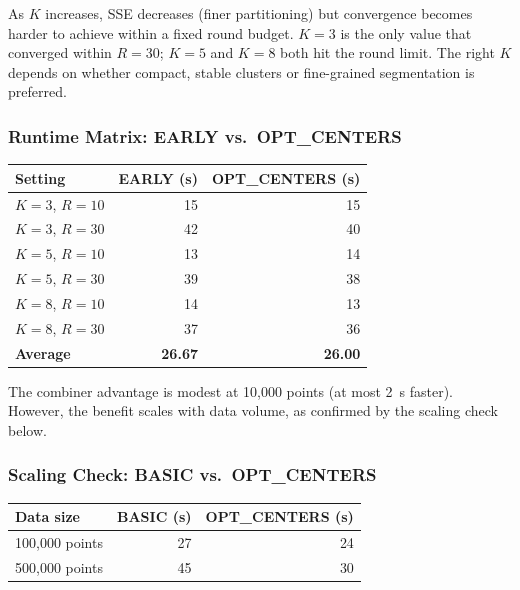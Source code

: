 \documentclass[11pt]{article}
\begin{document}
\begin{tcolorbox}[finding]
As $K$ increases, SSE decreases (finer partitioning) but convergence becomes harder to achieve within a fixed round budget. $K=3$ is the only value that converged within $R=30$; $K=5$ and $K=8$ both hit the round limit. The right $K$ depends on whether compact, stable clusters or fine-grained segmentation is preferred.
\end{tcolorbox}

\subsubsection*{Runtime Matrix: EARLY vs.\ OPT\_CENTERS}

\begin{center}
\begin{tabular}{@{}lrr@{}}
  \rowcolor{tableheader}
  \color{white}\textbf{Setting} &
  \color{white}\textbf{EARLY (s)} &
  \color{white}\textbf{OPT\_CENTERS (s)} \\
  \midrule
  $K=3$, $R=10$ & 15 & 15 \\
  \rowcolor{tablealt}
  $K=3$, $R=30$ & 42 & 40 \\
  $K=5$, $R=10$ & 13 & 14 \\
  \rowcolor{tablealt}
  $K=5$, $R=30$ & 39 & 38 \\
  $K=8$, $R=10$ & 14 & 13 \\
  \rowcolor{tablealt}
  $K=8$, $R=30$ & 37 & 36 \\
  \midrule
  \textbf{Average} & \textbf{26.67} & \textbf{26.00} \\
\end{tabular}
\end{center}

The combiner advantage is modest at 10,000 points (at most 2~s faster). However, the benefit scales with data volume, as confirmed by the scaling check below.

\subsubsection*{Scaling Check: BASIC vs.\ OPT\_CENTERS}

\begin{center}
\begin{tabular}{@{}lrr@{}}
  \rowcolor{tableheader}
  \color{white}\textbf{Data size} &
  \color{white}\textbf{BASIC (s)} &
  \color{white}\textbf{OPT\_CENTERS (s)} \\
  \midrule
  100,000 points & 27 & 24 \\
  \rowcolor{tablealt}
  500,000 points & 45 & 30 \\
\end{tabular}
\end{center}
\end{document}
